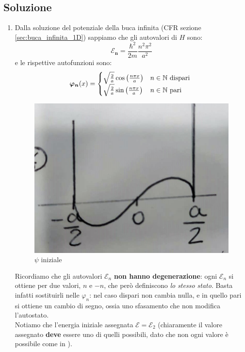 \documentclass[../../FisicaTeorica.tex]{subfiles}
\begin{document}
\subsection{Soluzione}
\begin{enumerate}
\item Dalla soluzione del potenziale della buca infinita (CFR sezione \ref{sec:buca_infinita_1D}) sappiamo che gli autovalori di $H$ sono:
\begin{equation}
\bm{\mathcal{E}_n} = \frac{\hbar^2}{2m}\frac{n^2 \pi^2}{a^2}
\label{eqn:autoval_buca_infinita}
\end{equation}
e le rispettive autofunzioni sono:
\[
\bm{\varphi_n}(x)=\begin{cases}
\sqrt{\frac{2}{a}}\cos\left(\frac{n\pi x}{a}\right) & n \in \mathbb{N} \text{ dispari }\\
\sqrt{\frac{2}{a}}\sin\left(\frac{n\pi x}{a}\right) & n\in \mathbb{N} \text{ pari}
\end{cases}
\]
\begin{figure}[H]
\centering
\includegraphics[scale=0.4]{Immagini/15_11/img2.jpeg}
\caption{$\psi$ iniziale}
\end{figure}
Ricordiamo che gli autovalori $\mathcal{E}_n$ \textbf{non hanno degenerazione}: ogni $\mathcal{E}_n$ si ottiene per due valori, $n$ e $-n$, che però definiscono \textit{lo stesso stato}. Basta infatti sostituirli nelle $\varphi_n$: nel caso dispari non cambia nulla, e in quello pari si ottiene un cambio di segno, ossia uno sfasamento che non modifica l'autostato.\\ 
Notiamo che l'energia iniziale assegnata $\mathcal{E}=\mathcal{E}_2$ (chiaramente il valore assegnato \textbf{deve} essere uno di quelli possibili, dato che non ogni valore è possibile come in \MC).\\

\end{enumerate}
\end{document}
